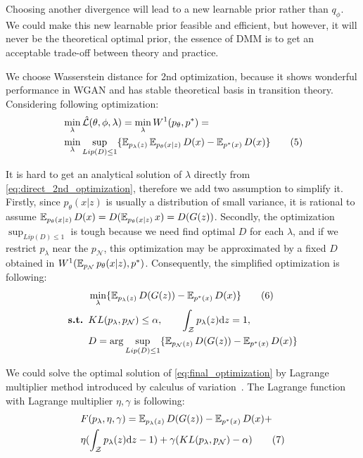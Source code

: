 Choosing another divergence will lead to a new learnable prior rather than $q_\phi$. We could make this new learnable prior feasible and efficient, but however, it will never be the theoretical optimal prior, \IE the essence of DMM is to get an acceptable trade-off between theory and practice. 

We choose Wasserstein distance for 2nd optimization, because it shows wonderful performance in WGAN and has stable theoretical basis in transition theory. Considering following optimization:
\begin{align*}\label{eq:direct_2nd_optimization}
	& \min_{\lambda} \hat{\mathcal{L}}(\theta, \phi, \lambda) = \min_{\lambda} W^1(p_\theta, p^*) = \\
	& \min_{\lambda} \sup_{Lip(D) \leq 1} \{\operatorname{\mathbb{E}}_{p_\lambda(z)} \operatorname{\mathbb{E}}_{p_\theta(x|z)} D(x)  - \operatorname{\mathbb{E}}_{p^*(x)} D(x)\} 
	\tag{5}
\end{align*}

It is hard to get an analytical solution of $\lambda$ directly from \cref{eq:direct_2nd_optimization}, therefore we add two assumption to simplify it. Firstly, since $p_\theta(x|z)$ is usually a distribution of small variance, it is rational to assume $\operatorname{\mathbb{E}}_{p_\theta(x|z)} D(x) = D(\operatorname{\mathbb{E}}_{p_\theta(x|z)} x) = D(G(z))$. Secondly, the optimization $\sup_{Lip(D) \leq 1}$ is tough because we need find optimal $D$ for each $\lambda$, and if we restrict $p_\lambda$ near the $p_\mathcal{N}$, this optimization may be approximated by a fixed $D$ obtained in $W^1(\operatorname{\mathbb{E}}_{p_\mathcal{N}}p_\theta(x|z), p^*)$. Consequently, the simplified optimization is following:
\begin{align*}\label{eq:final_optimization}
	& \min_{\lambda} \{\operatorname{\mathbb{E}}_{p_\lambda(z)} D(G(z))  - \operatorname{\mathbb{E}}_{p^*(x)} D(x)\} \tag{6} \\
	{\textbf{s.t. }} & KL(p_\lambda, p_\mathcal{N}) \leq \alpha, \qquad \int_{\mathcal{Z}} p_\lambda(z) \mathrm{d} z = 1, \\
	& D = \arg \sup_{Lip(D) \leq 1} \{\operatorname{\mathbb{E}}_{p_\mathcal{N}(z)} D(G(z))  - \operatorname{\mathbb{E}}_{p^*(x)} D(x)\}
\end{align*}

We could solve the optimal solution of \cref{eq:final_optimization} by Lagrange multiplier method introduced by calculus of variation~\cite{gelfand2000calculus}. The Lagrange function with Lagrange multiplier $\eta, \gamma$ is following:
\begin{align*}\label{eq:lagrange_function}
& F(p_\lambda, \eta, \gamma) = \operatorname{\mathbb{E}}_{p_\lambda(z)} D(G(z))  - \operatorname{\mathbb{E}}_{p^*(x)} D(x) + \\
& \eta (\int_{\mathcal{Z}} p_\lambda(z) \mathrm{d} z - 1) + \gamma(KL(p_\lambda, p_\mathcal{N}) - \alpha) \tag{7}
\end{align*}

